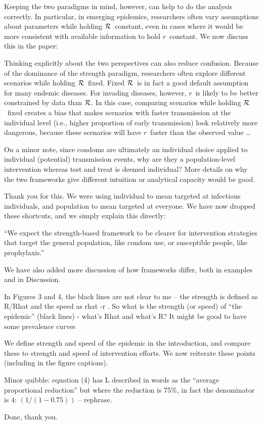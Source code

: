 \documentclass[12pt]{article}
\newcommand{\rr}{\ensuremath{{r}}}
\newcommand{\RR}{\ensuremath{{\cal R}}}
\newcommand{\revtext}{\textsf}
\begin{document}
Keeping the two paradigms in mind, however, can help to do the analysis correctly.
In particular, in emerging epidemics, researchers often vary assumptions about parameters while holding \RR\ constant, even in cases where it would be more consistent with available information to hold \rr\ constant.
We now discuss this in the paper:

Thinking explicitly about the two perspectives can also reduce confusion. Because of the dominance of the strength paradigm, researchers often explore different scenarios while holding \RR\ fixed. Fixed \RR\ is in fact a good default assumption for many endemic diseases. For invading diseases, however, \rr\ is likely to be better constrained by data than \RR. In this case, comparing scenarios while holding \RR\ fixed creates a bias that makes scenarios with faster transmission at the individual level (i.e., higher proportion of early transmission) look relatively more dangerous, because these scenarios will have \rr\ faster than the observed value \ldots

\revtext{
On a minor note, since condoms are ultimately an individual choice
applied to individual (potential) transmission events, why are they a
population-level intervention whereas test and treat is deemed
individual? More details on why the two frameworks give different
intuition or analytical capacity would be good.
}

Thank you for this. We were using individual to mean targeted at
infectious individuals, and population to mean targeted at everyone. We
have now dropped these shortcuts, and we simply explain this directly:

``We expect the strength-based framework to be clearer for intervention strategies that target the general population, like condom use, or susceptible people, like prophylaxis.''

We have also added more discussion of how frameworks differ, both in examples and in Discussion.

\revtext{In Figures 3 and 4, the black lines are not clear to me -- the strength
is defined as R/Rhat and the speed as rhat -r . So what is the strength
(or speed) of ``the epidemic'' (black lines) - what's Rhat and what's R?
It might be good to have some prevalence curves}

We define strength and speed of the epidemic in the introduction, and
compare these to strength and speed of intervention efforts. We now
reiterate these points (including in the figure captions).

\revtext{
Minor quibble: equation (4) has L described in words as the ``average
proportional reduction'' but where the reduction is 75\%, in fact the
denominator is 4: $(1 / (1-0.75) )$ -- rephrase.
}

Done, thank you.
\end{document}
